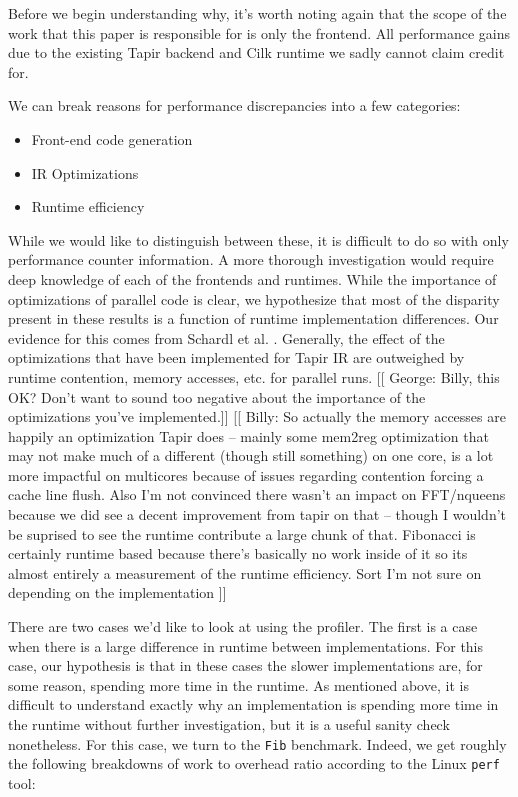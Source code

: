 \documentclass[sigconf]{acmart}
\newcommand{\wmnote}[1]{{\scriptsize \color{red} [[ Billy: #1]]}}
\newcommand{\gsnote}[1]{{\scriptsize \color{blue} [[ George: #1]]}}
\begin{document}
Before we begin understanding why, it's worth noting again that the scope of the 
work that this paper is responsible for is only the frontend. All performance
gains due to the existing Tapir backend and Cilk runtime we sadly cannot claim
credit for. 

We can break reasons for performance discrepancies into a few categories: 

\begin{itemize}
\item Front-end code generation
\item IR Optimizations
\item Runtime efficiency
\end{itemize}

While we would like to distinguish between these, it is difficult to do so with
only performance counter information. A more thorough investigation would
require deep knowledge of each of the frontends and runtimes. While the
importance of optimizations of parallel code is clear, we hypothesize that most
of the disparity present in these results is a function of runtime
implementation differences. Our evidence for this comes from Schardl et al.
\cite{tapir}. Generally, the effect of the optimizations that have been
implemented for Tapir IR are outweighed by runtime contention, memory accesses,
etc. for parallel runs. \gsnote{Billy, this OK? Don't want to sound too
negative about the importance of the optimizations you've implemented.}
\wmnote{So actually the memory accesses are happily an optimization Tapir does
-- mainly some mem2reg optimization that may not make much of a different (though still something)
on one core, is a lot more impactful on multicores because of issues regarding contention
forcing a cache line flush.
Also I'm not convinced there wasn't an impact on FFT/nqueens because we did see a
decent improvement from tapir on that -- though I wouldn't be suprised to see the runtime
contribute a large chunk of that.
Fibonacci is certainly runtime based because there's basically no work inside of
it so its almost entirely a measurement of the runtime efficiency.
Sort I'm not sure on depending on the implementation
}

There are two cases we'd like to look at using the profiler. The first is a 
case when there is a large difference in runtime between implementations. For 
this case, our hypothesis is that in these cases the slower implementations
are, for some reason, spending more time in the runtime. As mentioned above, 
it is difficult to understand exactly why an implementation is spending more 
time in the runtime without further investigation, but it is a useful 
sanity check nonetheless. For this case, we turn to the \texttt{Fib} benchmark.
Indeed, we get roughly the following breakdowns of work to overhead ratio
according to the Linux \texttt{perf} tool:
\end{document}
